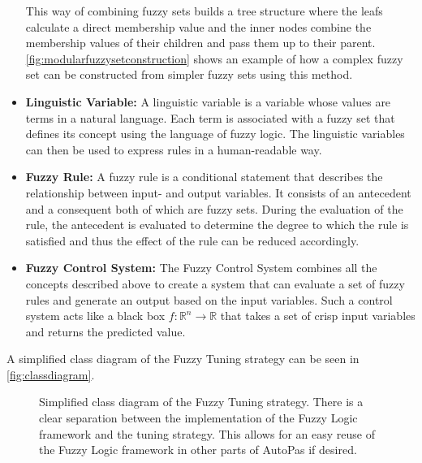 \begin{itemize}
        This way of combining fuzzy sets builds a tree structure where the leafs calculate a direct membership value and the inner nodes combine the membership values of their children and pass them up to their parent. \autoref{fig:modularfuzzysetconstruction} shows an example of how a complex fuzzy set can be constructed from simpler fuzzy sets using this method.

  \item \textbf{Linguistic Variable:} A linguistic variable is a variable whose values are terms in a natural language. Each term is associated with a fuzzy set that defines its concept using the language of fuzzy logic. The linguistic variables can then be used to express rules in a human-readable way.

  \item \textbf{Fuzzy Rule:} A fuzzy rule is a conditional statement that describes the relationship between input- and output variables. It consists of an antecedent and a consequent both of which are fuzzy sets. During the evaluation of the rule, the antecedent is evaluated to determine the degree to which the rule is satisfied and thus the effect of the rule can be reduced accordingly.

  \item \textbf{Fuzzy Control System:} The Fuzzy Control System combines all the concepts described above to create a system that can evaluate a set of fuzzy rules and generate an output based on the input variables. Such a control system acts like a black box $f: \mathbb{R}^n \rightarrow \mathbb{R}$ that takes a set of crisp input variables and returns the predicted value.
\end{itemize}

A simplified class diagram of the Fuzzy Tuning strategy can be seen in \autoref{fig:classdiagram}.

\begin{figure}[h]
  \centering
  
  \caption[Class diagram of the Fuzzy Tuning Strategy]{Simplified class diagram of the Fuzzy Tuning strategy. There is a clear separation between the implementation of the Fuzzy Logic framework and the tuning strategy. This allows for an easy reuse of the Fuzzy Logic framework in other parts of AutoPas if desired.}
  \label{fig:classdiagram}
\end{figure}


